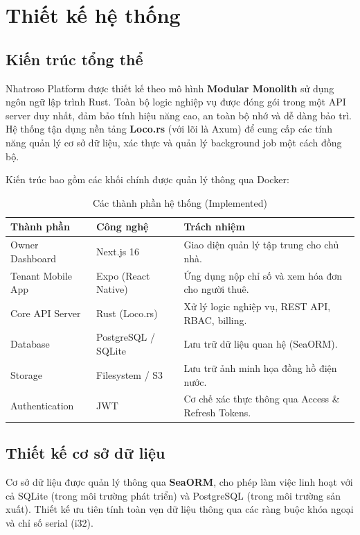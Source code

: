 \chapter{Thiết kế hệ thống}\label{chapter_design}

\section{Kiến trúc tổng thể}

Nhatroso Platform được thiết kế theo mô hình \textbf{Modular Monolith} sử dụng ngôn ngữ lập trình Rust. Toàn bộ logic nghiệp vụ được đóng gói trong một API server duy nhất, đảm bảo tính hiệu năng cao, an toàn bộ nhớ và dễ dàng bảo trì. Hệ thống tận dụng nền tảng \textbf{Loco.rs} (với lõi là Axum) để cung cấp các tính năng quản lý cơ sở dữ liệu, xác thực và quản lý background job một cách đồng bộ.

Kiến trúc bao gồm các khối chính được quản lý thông qua Docker:

\begin{table}[htbp]
\centering
\caption{Các thành phần hệ thống (Implemented)}
\label{tab:components}
\begin{tabularx}{\textwidth}{llX}
\toprule
\textbf{Thành phần} & \textbf{Công nghệ} & \textbf{Trách nhiệm} \\
\midrule
Owner Dashboard & Next.js 16 & Giao diện quản lý tập trung cho chủ nhà. \\
Tenant Mobile App & Expo (React Native) & Ứng dụng nộp chỉ số và xem hóa đơn cho người thuê. \\
Core API Server & Rust (Loco.rs) & Xử lý logic nghiệp vụ, REST API, RBAC, billing. \\
Database & PostgreSQL / SQLite & Lưu trữ dữ liệu quan hệ (SeaORM). \\
Storage & Filesystem / S3 & Lưu trữ ảnh minh họa đồng hồ điện nước. \\
Authentication & JWT & Cơ chế xác thực thông qua Access \& Refresh Tokens. \\
\bottomrule
\end{tabularx}
\end{table}

\section{Thiết kế cơ sở dữ liệu}

Cơ sở dữ liệu được quản lý thông qua \textbf{SeaORM}, cho phép làm việc linh hoạt với cả SQLite (trong môi trường phát triển) và PostgreSQL (trong môi trường sản xuất). Thiết kế ưu tiên tính toàn vẹn dữ liệu thông qua các ràng buộc khóa ngoại và chỉ số serial (i32).

